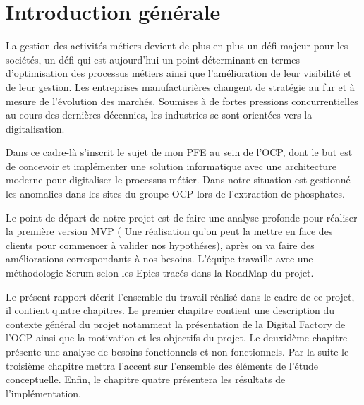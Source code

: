 \chapter*{Introduction g\'en\'erale}


La gestion des activit\'es m\'etiers devient de plus en plus un d\'efi majeur pour les soci\'et\'es, un d\'efi qui est aujourd'hui un point d\'eterminant en termes d'optimisation des processus m\'etiers ainsi que l'am\'elioration de leur visibilit\'e et de leur gestion. Les entreprises manufacturi\`eres changent de strat\'egie au fur et \`a mesure de l'\'evolution des march\'es. Soumises \`a de fortes pressions concurrentielles au cours des derni\`eres d\'ecennies, les industries se sont orient\'ees vers la digitalisation.

Dans ce cadre-l\`a s'inscrit le sujet de mon \gls{PFE} au sein de l'\gls{OCP}, dont le but est de concevoir et impl\'ementer une solution informatique avec une architecture moderne pour digitaliser le processus m\'etier. Dans notre situation est gestionn\'e les anomalies dans les sites du groupe \gls{OCP} lors de l'extraction de phosphates.

Le point de d\'epart de notre projet est de faire une analyse profonde pour r\'ealiser la premi\`ere version \gls{MVP} ( Une r\'ealisation qu'on peut la mettre en face des clients pour commencer \`a valider nos hypoth\'eses), apr\`es on va faire des am\'eliorations correspondants \`a nos besoins. L'\'equipe  travaille avec une m\'ethodologie Scrum selon les Epics trac\'es dans la RoadMap du projet.

Le pr\'esent rapport d\'ecrit l'ensemble du travail r\'ealis\'e dans le cadre de ce projet, il contient quatre chapitres. Le premier chapitre contient une description du contexte g\'en\'eral du projet notamment la pr\'esentation de la Digital Factory de l'\gls{OCP} ainsi que la motivation et les objectifs du projet. Le deuxid\`eme chapitre pr\'esente une analyse de besoins fonctionnels et non fonctionnels. Par la suite le troisi\`eme chapitre mettra l'accent sur l'ensemble des \'el\'ements de l'\'etude conceptuelle. Enfin, le chapitre quatre pr\'esentera les r\'esultats de l'impl\'ementation.